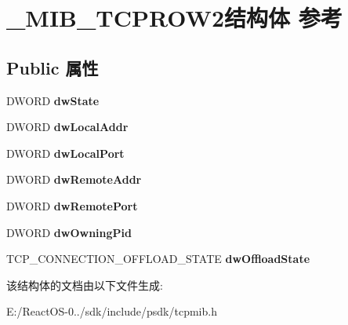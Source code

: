 \hypertarget{struct___m_i_b___t_c_p_r_o_w2}{}\section{\+\_\+\+M\+I\+B\+\_\+\+T\+C\+P\+R\+O\+W2结构体 参考}
\label{struct___m_i_b___t_c_p_r_o_w2}
\subsection*{Public 属性}
\begin{DoxyCompactItemize}
\item 
\mbox{\label{struct___m_i_b___t_c_p_r_o_w2_a4ee5b326cc17cec9e313c796cbb0c5a3}} 
D\+W\+O\+RD {\bfseries dw\+State}
\item 
\mbox{\label{struct___m_i_b___t_c_p_r_o_w2_ad013f67c111e7843519a4bec6d7421e3}} 
D\+W\+O\+RD {\bfseries dw\+Local\+Addr}
\item 
\mbox{\label{struct___m_i_b___t_c_p_r_o_w2_a218829ff05945f68044a4705158197de}} 
D\+W\+O\+RD {\bfseries dw\+Local\+Port}
\item 
\mbox{\label{struct___m_i_b___t_c_p_r_o_w2_ac0ce841287ae6c600a8a990dcb66723f}} 
D\+W\+O\+RD {\bfseries dw\+Remote\+Addr}
\item 
\mbox{\label{struct___m_i_b___t_c_p_r_o_w2_a4bcfc08a728efe51d657e412d8610560}} 
D\+W\+O\+RD {\bfseries dw\+Remote\+Port}
\item 
\mbox{\label{struct___m_i_b___t_c_p_r_o_w2_a31a87f61345641e4512d50b99241f70d}} 
D\+W\+O\+RD {\bfseries dw\+Owning\+Pid}
\item 
\mbox{\label{struct___m_i_b___t_c_p_r_o_w2_a9246b88b8220b73e05911cff3bdfc15d}} 
T\+C\+P\+\_\+\+C\+O\+N\+N\+E\+C\+T\+I\+O\+N\+\_\+\+O\+F\+F\+L\+O\+A\+D\+\_\+\+S\+T\+A\+TE {\bfseries dw\+Offload\+State}
\end{DoxyCompactItemize}


该结构体的文档由以下文件生成\+:\begin{DoxyCompactItemize}
\item 
E\+:/\+React\+O\+S-\/0../sdk/include/psdk/tcpmib.\+h\end{DoxyCompactItemize}
